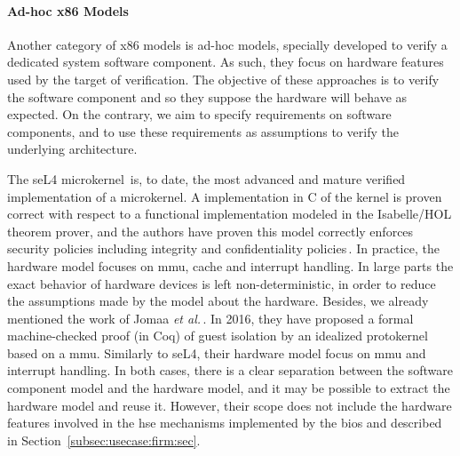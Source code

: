 \paragraph{Ad-hoc x86 Models}
%
Another category of x86 models is ad-hoc models, specially developed to verify a
dedicated system software component.
%
As such, they focus on hardware features used by the target of verification.
%
The objective of these approaches is to verify the software component and so
they suppose the hardware will behave as expected.
%
On the contrary, we aim to specify requirements on software components, and to
use these requirements as assumptions to verify the underlying architecture.

The seL4 microkernel\,\cite{sel4website} is, to date, the most advanced and
mature verified implementation of a microkernel.
%
A implementation in C of the kernel is proven correct with respect to a
functional implementation modeled in the Isabelle/HOL theorem prover, and the
authors have proven this model correctly enforces security policies including
integrity and confidentiality policies\,\cite{klein2009sel4}.
%
In practice, the hardware model focuses on \ac{mmu}, cache and interrupt
handling.
%
In large parts the exact behavior of hardware devices is left non-deterministic,
in order to reduce the assumptions made by the model about the hardware.
%
Besides, we already mentioned the work of Jomaa \emph{et
  al.}\,\cite{jomaa2016mmu}.
%
In 2016, they have proposed a formal machine-checked proof (in Coq) of guest
isolation by an idealized protokernel based on a \ac{mmu}.
%
Similarly to seL4, their hardware model focus on \ac{mmu} and interrupt
handling.
%
In both cases, there is a clear separation between the software component model
and the hardware model, and it may be possible to extract the hardware model and
reuse it.
%
However, their scope does not include the hardware features involved in the
\ac{hse} mechanisms implemented by the \ac{bios} and described in
Section~\ref{subsec:usecase:firm:sec}.

